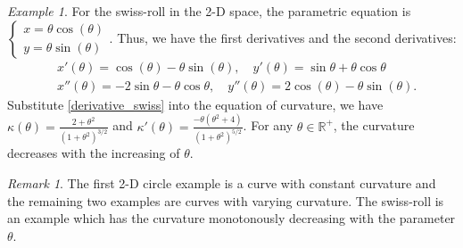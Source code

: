 \documentclass{article}
\theoremstyle{remark}
\newtheorem*{remark}{Remark}
\newtheorem{example}{Example}
\begin{document}
\begin{example}
For the swiss-roll in the 2-D space, the parametric equation is $\left\{ \begin{array}{c} x=\theta\cos(\theta)\\ y = \theta\sin(\theta)\end{array}\right.$. Thus, we have the first derivatives and the second derivatives:
\begin{equation}\label{derivative_swiss}
\begin{aligned}
&x'(\theta)=\cos(\theta)-\theta\sin(\theta),\quad y'(\theta)=\sin\theta+\theta\cos\theta\\
&x''(\theta)=-2\sin\theta-\theta\cos\theta,\quad y''(\theta)=2\cos(\theta)-\theta\sin(\theta).
\end{aligned}
\end{equation}
Substitute \eqref{derivative_swiss} into the equation of curvature, we have $\kappa(\theta)=\frac{2+\theta^2}{(1+\theta^2)^{3/2}}$ and $\kappa'(\theta) =\frac{ -\theta(\theta^2+4)}{(1+\theta^2)^{5/2}}$. For any $\theta\in {\mathbb R}^+$, the curvature decreases with the increasing of $\theta$.
\end{example}
\begin{remark}
The first 2-D circle example is a curve with constant curvature and the remaining two examples are curves with varying curvature. The swiss-roll is an example which has the curvature monotonously decreasing with the parameter $\theta$. %
\end{remark}
\end{document}
